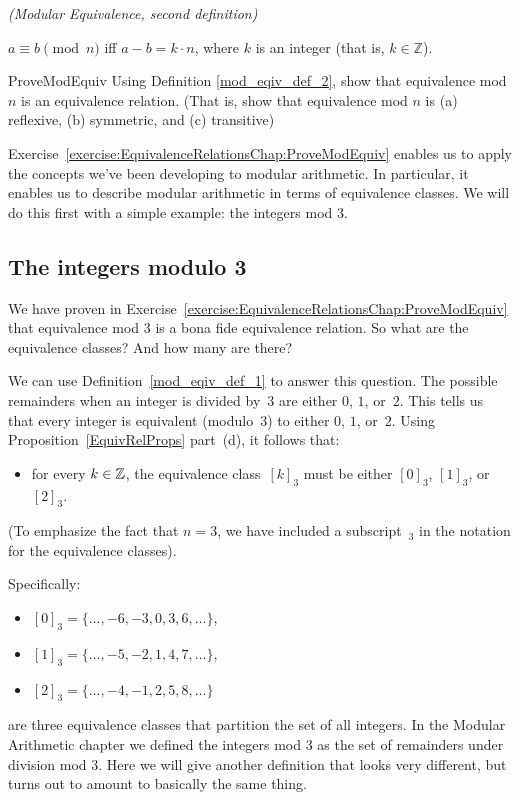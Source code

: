 \begin{defn}\label{mod_eqiv_def_2} \emph{(Modular Equivalence, second definition)}

\medskip
$a \equiv b \pmod{n}$ iff $a - b = k \cdot n$, where $k$ is an integer (that is, $k \in  {\mathbb Z}$). 
\end{defn}

\begin{exercise}{ProveModEquiv}
Using  Definition  \ref{mod_eqiv_def_2}, show that equivalence mod $n$ is an equivalence relation. (That is, show that equivalence mod $n$ is (a) reflexive, (b) symmetric, and (c) transitive)
\end{exercise}

Exercise~\ref{exercise:EquivalenceRelationsChap:ProveModEquiv} enables us to apply the concepts we've been developing to modular arithmetic. In particular, it enables us to describe modular arithmetic in terms of equivalence classes. We will do this first with a simple example: the integers mod 3.

\subsection{The integers modulo 3}\label{sec:intMod3}

We have proven in Exercise~\ref{exercise:EquivalenceRelationsChap:ProveModEquiv} that equivalence mod 3 is a bona fide equivalence relation. So what are the equivalence classes? And how many are there?
\medskip

We can use Definition~\ref{mod_eqiv_def_1} to answer this question. The possible remainders when an integer is divided by~$3$ are either $0$, $1$, or~$2$. This tells us that  every integer is equivalent (modulo~$3$) to either $0$, $1$, or~$2$. Using Proposition~\ref{EquivRelProps} part~(d), it follows that:
\begin{itemize}
\item[] for every $k \in \mathbb{Z}$, the equivalence class~$[k]_3$ must be either $[0]_3$, $[1]_3$, or~$[2]_3$.
\end{itemize}
(To emphasize the fact that $n = 3$, we have included a subscript~${}_3$ in the notation for the equivalence classes).

\noindent
Specifically:
\begin{itemize}
\item[]
$[0]_3 = \{ \ldots, -6, -3, 0, 3, 6, \ldots \}$,
\item[]
$[1]_3 = \{ \ldots, -5, -2, 1, 4, 7, \ldots \}$,
\item[]
$[2]_3 = \{ \ldots, -4, -1, 2, 5, 8, \ldots \}$
\end{itemize}
are three equivalence classes that partition the set of all  integers.
In the Modular Arithmetic chapter we defined the integers mod 3 as the set of remainders under division mod 3. Here we will give another definition that looks very different, but turns out to amount to basically the same thing.

